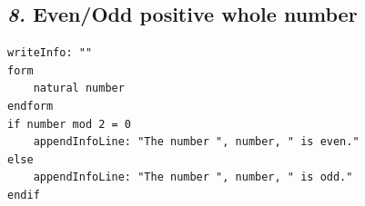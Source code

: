\documentclass[12pt, english]{article}
\begin{document}
\subsection*{\emph{8.} Even/Odd positive whole number}

\begin{lstlisting}[rulesepcolor=\color{blue}]
writeInfo: ""
form
    natural number
endform
if number mod 2 = 0
    appendInfoLine: "The number ", number, " is even."
else
    appendInfoLine: "The number ", number, " is odd."
endif
\end{lstlisting}
\vspace{10pt}
\end{document}
